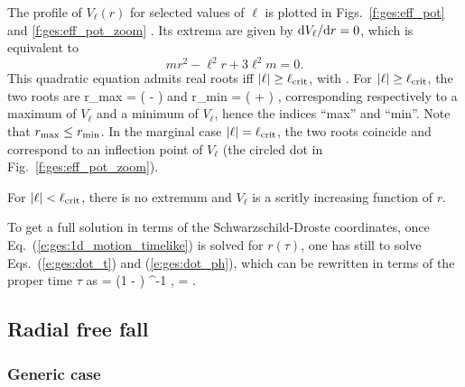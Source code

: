 The profile  of $V_{\ell}(r)$ for selected values of $\ell$ is
plotted in Figs.~\ref{f:ges:eff_pot} and \ref{f:ges:eff_pot_zoom} .
Its extrema are given by
$\mathrm{d} V_{\ell}/\mathrm{d} r=0$, which is equivalent to
\[
    m r^2 - \ell^2 r + 3 \ell^2 m = 0 .
\]
This quadratic equation admits real roots iff $|\ell| \geq \ell_{\rm crit}$,
with
\be \label{e:ges:ell_crit}
   .
\ee
For $|\ell| \geq \ell_{\rm crit}$, the two roots are
\be
    r_{\rm max} =  \left( \ell -
     \right)
    \qquad\mbox{and}\qquad
    r_{\rm min} =  \left( \ell +
     \right) ,
\ee
corresponding respectively to a maximum of $V_{\ell}$ and a minimum
of $V_{\ell}$, hence the indices ``max'' and ``min''. Note that
$r_{\rm max} \leq r_{\rm min}$.
In the marginal case $|\ell| = \ell_{\rm crit}$, the two roots
coincide and correspond to an inflection point of $V_{\ell}$ (the circled
dot in Fig.~\ref{f:ges:eff_pot_zoom}).

For $|\ell| < \ell_{\rm crit}$, there is no extremum and
$V_{\ell}$ is a scritly increasing function of $r$.


To get a full solution in terms of the Schwarzschild-Droste coordinates,
once Eq.~(\ref{e:ges:1d_motion_timelike}) is solved for $r(\tau)$,
one has still to solve Eqs.~(\ref{e:ges:dot_t}) and (\ref{e:ges:dot_ph}),
which can be rewritten in terms of the proper time $\tau$ as
\be \label{e:ges:Dt_Dtau}
     = \veps \left(1 -  \right) ^{-1} ,
\ee
\be \label{e:ges:Dph_Dtau}
    \frac{\D\ph}{\D\tau} =   .
\ee


\subsection{Radial free fall} \label{s:ges:radial_free_fall}

\subsubsection{Generic case}

